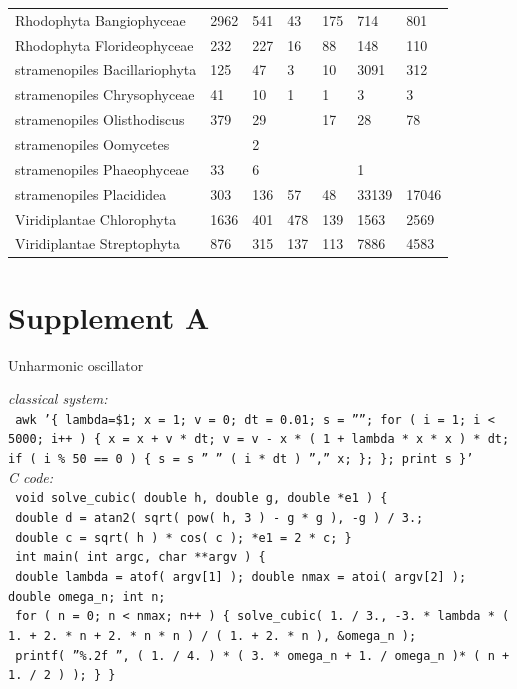 \documentclass[a4paper]{article}
\begin{document}
\begin{tabular}{lllllll}
Rhodophyta Bangiophyceae&2962&541&43&175&714&801\\
Rhodophyta Florideophyceae&232&227&16&88&148&110\\
stramenopiles Bacillariophyta&125&47&3&10&3091&312\\
stramenopiles Chrysophyceae&41&10&1&1&3&3\\
stramenopiles Olisthodiscus&379&29&&17&28&78\\
stramenopiles Oomycetes&&2&&&&\\
stramenopiles Phaeophyceae&33&6&&&1&\\
stramenopiles Placididea&303&136&57&48&33139&17046\\
Viridiplantae Chlorophyta&1636&401&478&139&1563&2569\\
Viridiplantae Streptophyta&876&315&137&113&7886&4583\\
\hline
\end{tabular}



\section*{Supplement A} 

Unharmonic oscillator

\textit{classical system:}\\
\texttt{\tiny{ awk '\{ lambda=\$1; x = 1; v = 0; dt = 0.01; s = ''''; for ( i = 1; i < 5000; i++ ) \{ x = x + v * dt; v = v - x * ( 1 + lambda * x * x ) * dt; if ( i \% 50 == 0 ) \{ s = s '' '' ( i * dt ) '','' x; \}; \}; print s \}' }} \\

\textit{C code:}\\
\texttt{\tiny{ void solve\_cubic( double h, double g, double *e1 ) \{ }} \\
\texttt{\tiny{ double d = atan2( sqrt( pow( h, 3 ) - g * g ), -g ) / 3.; }}\\
\texttt{\tiny{ double c = sqrt( h ) * cos( c ); *e1 = 2 * c; \} }} \\
\texttt{\tiny{ int main( int argc, char **argv ) \{ }} \\
\texttt{\tiny{ double lambda = atof( argv[1] ); double nmax = atoi( argv[2] ); double omega\_n; int n; }} \\
\texttt{\tiny{ for ( n = 0; n < nmax; n++ ) \{ solve\_cubic( 1. / 3., -3. * lambda * ( 1. + 2. * n + 2. * n * n ) / ( 1. + 2. * n ), \&omega\_n ); }} \\
\texttt{\tiny{ printf( ''\%.2f '', ( 1. / 4. ) * ( 3. * omega\_n + 1. / omega\_n )* ( n + 1. / 2 ) ); \} \} }} \\
\end{document}
